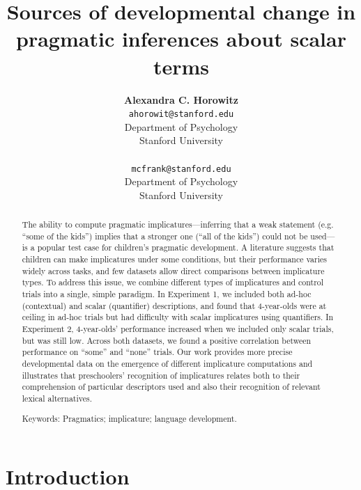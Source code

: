 \documentclass[10pt,letterpaper]{article}
\title{Sources of developmental change in pragmatic inferences about scalar terms}
\author{{\large \bf Alexandra C. Horowitz} \\ \texttt{ahorowit@stanford.edu}\\ Department of Psychology \\ Stanford University \\ 
\And {\large \bf Michael C. Frank} \\ \texttt{mcfrank@stanford.edu} \\ Department of Psychology \\ Stanford University \\ }
\begin{document}
\maketitle

\begin{abstract} 

The ability to compute pragmatic implicatures---inferring that a weak statement (e.g. ``some of the kids'') implies that a stronger one (``all of the kids'') could not be used---is a popular test case for children's pragmatic development. A literature suggests that children can make implicatures under some conditions, but their performance varies widely across tasks, and few datasets allow direct comparisons between implicature types. To address this issue, we combine different types of implicatures and control trials into a single, simple paradigm. In Experiment 1, we included both ad-hoc (contextual) and scalar (quantifier) descriptions, and found that 4-year-olds were at ceiling in ad-hoc trials but had difficulty with scalar implicatures using quantifiers.  In Experiment 2, 4-year-olds' performance increased when we included only scalar trials, but was still low. Across both datasets, we found a positive correlation between performance on ``some'' and ``none'' trials. Our work provides more precise developmental data on the emergence of different implicature computations and illustrates that preschoolers' recognition of implicatures relates both to their comprehension of particular descriptors used and also their recognition of relevant lexical alternatives. 




{Keywords:} Pragmatics; implicature; language development. 
\end{abstract}

\section{Introduction}
\end{document}
